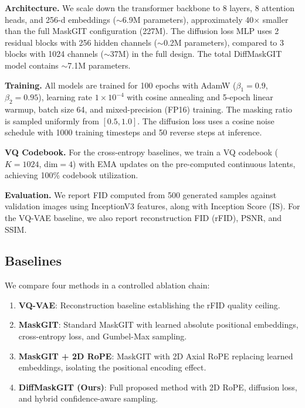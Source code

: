 \documentclass[conference]{IEEEtran}
\begin{document}
\textbf{Architecture.} We scale down the transformer backbone to 8 layers, 8 attention heads, and 256-d embeddings ($\sim$6.9M parameters), approximately 40$\times$ smaller than the full MaskGIT configuration (227M). The diffusion loss MLP uses 2 residual blocks with 256 hidden channels ($\sim$0.2M parameters), compared to 3 blocks with 1024 channels ($\sim$37M) in the full design. The total DiffMaskGIT model contains $\sim$7.1M parameters.

\textbf{Training.} All models are trained for 100 epochs with AdamW ($\beta_1{=}0.9$, $\beta_2{=}0.95$), learning rate $1\times10^{-4}$ with cosine annealing and 5-epoch linear warmup, batch size 64, and mixed-precision (FP16) training. The masking ratio is sampled uniformly from $[0.5, 1.0]$. The diffusion loss uses a cosine noise schedule with 1000 training timesteps and 50 reverse steps at inference.

\textbf{VQ Codebook.} For the cross-entropy baselines, we train a VQ codebook ($K{=}1024$, dim${=}4$) with EMA updates on the pre-computed continuous latents, achieving 100\% codebook utilization.

\textbf{Evaluation.} We report FID computed from 500 generated samples against validation images using InceptionV3 features, along with Inception Score (IS). For the VQ-VAE baseline, we also report reconstruction FID (rFID), PSNR, and SSIM.

\subsection{Baselines}

We compare four methods in a controlled ablation chain:

\begin{enumerate}
\item \textbf{VQ-VAE}: Reconstruction baseline establishing the rFID quality ceiling.
\item \textbf{MaskGIT}: Standard MaskGIT with learned absolute positional embeddings, cross-entropy loss, and Gumbel-Max sampling.
\item \textbf{MaskGIT + 2D RoPE}: MaskGIT with 2D Axial RoPE replacing learned embeddings, isolating the positional encoding effect.
\item \textbf{DiffMaskGIT (Ours)}: Full proposed method with 2D RoPE, diffusion loss, and hybrid confidence-aware sampling.
\end{enumerate}

\end{document}
